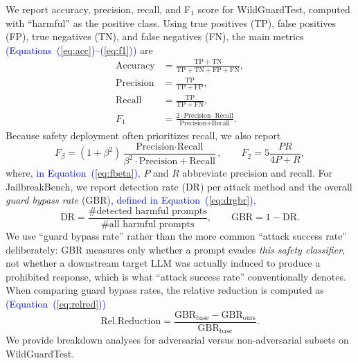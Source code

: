 \documentclass[superintelligence,article,accept,moreauthors]{Definitions/mdpi}
\newcommand{\authchg}[1]{\textcolor{blue}{#1}}
\begin{document}
We report accuracy, precision, recall, and F$_1$ score for WildGuardTest, computed with ``harmful'' as the positive class. Using true positives (TP), false positives (FP), true negatives (TN), and false negatives (FN), the main metrics \authchg{(Equations~(\ref{eq:acc})--(\ref{eq:f1}))} are
\begin{align}
  \text{Accuracy} &= \frac{\mathrm{TP}+\mathrm{TN}}{\mathrm{TP}+\mathrm{TN}+\mathrm{FP}+\mathrm{FN}},\label{eq:acc} \\
  \text{Precision} &= \frac{\mathrm{TP}}{\mathrm{TP}+\mathrm{FP}},\label{eq:prec} \\
  \text{Recall} &= \frac{\mathrm{TP}}{\mathrm{TP}+\mathrm{FN}},\label{eq:rec} \\
  F_{1} &= \frac{2 \cdot \text{Precision} \cdot \text{Recall}}{\text{Precision}+\text{Recall}}.\label{eq:f1}
\end{align}
Because safety deployment often prioritizes recall, we also report
\begin{equation}
  F_{\beta} = (1+\beta^2)\frac{\text{Precision} \cdot \text{Recall}}{\beta^2 \cdot \text{Precision} + \text{Recall}},
  \qquad F_2 = 5\frac{PR}{4P + R},\label{eq:fbeta}
\end{equation}
where\authchg{, in Equation~(\ref{eq:fbeta}),} $P$ and $R$ abbreviate precision and recall. For JailbreakBench, we report detection rate (DR) per attack method and the overall \emph{guard bypass rate} (GBR)\authchg{, defined in Equation~(\ref{eq:drgbr}),}
\begin{equation}
  \mathrm{DR} = \frac{\#\text{detected harmful prompts}}{\#\text{all harmful prompts}},
  \qquad
  \mathrm{GBR} = 1 - \mathrm{DR}.\label{eq:drgbr}
\end{equation}
We use ``guard bypass rate'' rather than the more common ``attack success rate'' deliberately: GBR measures only whether a prompt evades \emph{this safety classifier}, not whether a downstream target LLM was actually induced to produce a prohibited response, which is what ``attack success rate'' conventionally denotes. When comparing guard bypass rates, the relative reduction is computed as \authchg{(Equation~(\ref{eq:relred}))}
\begin{equation}
  \mathrm{Rel.Reduction} = \frac{\mathrm{GBR}_{\text{base}} - \mathrm{GBR}_{\text{ours}}}{\mathrm{GBR}_{\text{base}}}.\label{eq:relred}
\end{equation}
We provide breakdown analyses for adversarial versus non-adversarial subsets on WildGuardTest.
\end{document}
